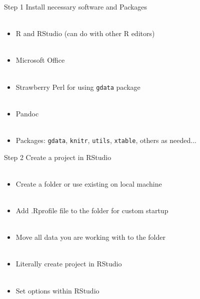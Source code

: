 \documentclass[xcolor=svgnames]{beamer}\usepackage[]{graphicx}\usepackage[]{color}
\begin{document}
\begin{frame}{Step 1}
Install necessary software and Packages \\~\\
\begin{itemize}
\item R and RStudio (can do with other R editors)\\~\\
\item Microsoft Office\\~\\
\item Strawberry Perl for using \texttt{gdata} package\\~\\
\item Pandoc\\~\\
\item Packages: \texttt{gdata}, \texttt{knitr}, \texttt{utils}, \texttt{xtable}, others as needed...
\end{itemize}
\end{frame}

\begin{frame}{Step 2}
Create a project in RStudio \\~\\
\begin{itemize}
\item Create a folder or use existing on local machine \\~\\
\item Add .Rprofile file to the folder for custom startup \\~\\
\item Move all data you are working with to the folder \\~\\
\item Literally create project in RStudio \\~\\
\item Set options within RStudio \\~\\
\end{itemize}
\end{frame}
\end{document}
